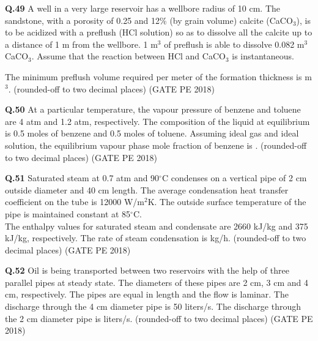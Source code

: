 \documentclass[journal,12pt,onecolumn]{IEEEtran}
\theoremstyle{remark}
\begin{document}
\vspace{1cm}

\noindent\textbf{Q.49} A well in a very large reservoir has a wellbore radius of 10 cm. The sandstone, with a porosity of 0.25 and 12\% (by grain volume) calcite (CaCO$_3$), is to be acidized with a preflush (HCl solution) so as to dissolve all the calcite up to a distance of 1 m from the wellbore. 1 m$^3$ of preflush is able to dissolve 0.082 m$^3$ CaCO$_3$. Assume that the reaction between HCl and CaCO$_3$ is instantaneous. 

The minimum preflush volume required per meter of the formation thickness is \underline{\hspace{2cm}} m$^3$. (rounded-off to two decimal places) \hfill (GATE PE 2018)

\vspace{1cm}

\noindent\textbf{Q.50} At a particular temperature, the vapour pressure of benzene and toluene are 4 atm and 1.2 atm, respectively. The composition of the liquid at equilibrium is 0.5 moles of benzene and 0.5 moles of toluene. Assuming ideal gas and ideal solution, the equilibrium vapour phase mole fraction of benzene is \underline{\hspace{2cm}}. (rounded-off to two decimal places) \hfill (GATE PE 2018)

\pagebreak

\noindent\textbf{Q.51} Saturated steam at 0.7 atm and 90$^\circ$C condenses on a vertical pipe of 2 cm outside diameter and 40 cm length. The average condensation heat transfer coefficient on the tube is 12000 W/m$^2$K. The outside surface temperature of the pipe is maintained constant at 85$^\circ$C. \\ 
The enthalpy values for saturated steam and condensate are 2660 kJ/kg and 375 kJ/kg, respectively. The rate of steam condensation is \underline{\hspace{2cm}} kg/h. (rounded-off to two decimal places) \hfill (GATE PE 2018)

\vspace{1cm}

\noindent\textbf{Q.52} Oil is being transported between two reservoirs with the help of three parallel pipes at steady state. The diameters of these pipes are 2 cm, 3 cm and 4 cm, respectively. The pipes are equal in length and the flow is laminar. The discharge through the 4 cm diameter pipe is 50 liters/s. The discharge through the 2 cm diameter pipe is \underline{\hspace{2cm}} liters/s. (rounded-off to two decimal places) \hfill (GATE PE 2018)
\end{document}
